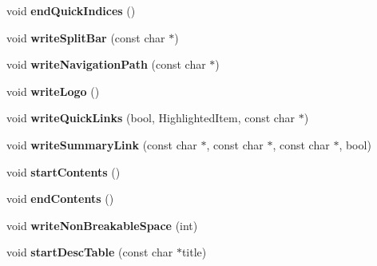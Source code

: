 \begin{DoxyCompactItemize}
\item 
\hypertarget{class_r_t_f_generator_a8ccfa7b4cc697673db66d95470901da6}{void {\bfseries end\-Quick\-Indices} ()}\label{class_r_t_f_generator_a8ccfa7b4cc697673db66d95470901da6}

\item 
\hypertarget{class_r_t_f_generator_a465317b1419a8fc5bfb7cb94cddbfc98}{void {\bfseries write\-Split\-Bar} (const char $\ast$)}\label{class_r_t_f_generator_a465317b1419a8fc5bfb7cb94cddbfc98}

\item 
\hypertarget{class_r_t_f_generator_aa3b9c49f8e870752e8751d1a6c72b2c0}{void {\bfseries write\-Navigation\-Path} (const char $\ast$)}\label{class_r_t_f_generator_aa3b9c49f8e870752e8751d1a6c72b2c0}

\item 
\hypertarget{class_r_t_f_generator_ac7d0ac7d2abfeba04c9c22a3974221ae}{void {\bfseries write\-Logo} ()}\label{class_r_t_f_generator_ac7d0ac7d2abfeba04c9c22a3974221ae}

\item 
\hypertarget{class_r_t_f_generator_aa2ca76705a3c909c124824bbaee17e61}{void {\bfseries write\-Quick\-Links} (bool, Highlighted\-Item, const char $\ast$)}\label{class_r_t_f_generator_aa2ca76705a3c909c124824bbaee17e61}

\item 
\hypertarget{class_r_t_f_generator_ad1487847ca7844acf3cd6b0f114b651a}{void {\bfseries write\-Summary\-Link} (const char $\ast$, const char $\ast$, const char $\ast$, bool)}\label{class_r_t_f_generator_ad1487847ca7844acf3cd6b0f114b651a}

\item 
\hypertarget{class_r_t_f_generator_a4d02a081921a34660b9f11e7c32a303f}{void {\bfseries start\-Contents} ()}\label{class_r_t_f_generator_a4d02a081921a34660b9f11e7c32a303f}

\item 
\hypertarget{class_r_t_f_generator_a89af32c9958f2fc61301a25e7b3360c7}{void {\bfseries end\-Contents} ()}\label{class_r_t_f_generator_a89af32c9958f2fc61301a25e7b3360c7}

\item 
\hypertarget{class_r_t_f_generator_a7c7ac7747fa458bcc89aa71c0764459b}{void {\bfseries write\-Non\-Breakable\-Space} (int)}\label{class_r_t_f_generator_a7c7ac7747fa458bcc89aa71c0764459b}

\item 
\hypertarget{class_r_t_f_generator_a6f7fc449c9d4d715c169881f1a54eea2}{void {\bfseries start\-Desc\-Table} (const char $\ast$title)}\label{class_r_t_f_generator_a6f7fc449c9d4d715c169881f1a54eea2}


\end{DoxyCompactItemize}
